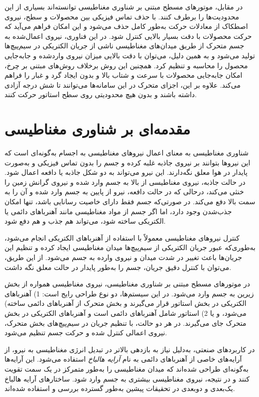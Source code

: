 در مقابل، موتورهای مسطح مبتنی‌ بر شناوری مغناطیسی
 توانسته‌اند بسیاری از این محدودیت‌ها را برطرف کنند. با حذف تماس فیزیکی بین محصولات و سطح، نیروی اصطکاک از معادلات حرکت به‌طور کامل حذف می‌شود و این امکان فراهم می‌آید که حرکت محصولات با دقت بسیار بالایی کنترل شود. در این فناوری، نیروی اعمال‌شده به جسم متحرک از طریق میدان‌های مغناطیسی ناشی از جریان الکتریکی در سیم‌پیچ‌ها تولید می‌شود و به همین دلیل، می‌توان با دقت بالایی میزان نیروی واردشده و جابه‌جایی محصول را محاسبه و تنظیم کرد. همچنین این روش برخلاف روش‌های مبتنی‌ بر چرخ، امکان جابه‌جایی محصولات با سرعت و شتاب بالا و بدون ایجاد گرد و غبار را فراهم می‌کند. علاوه‌ بر این، اجزای متحرک در این سامانه‌ها می‌توانند تا شش درجه آزادی داشته باشند و بدون هیچ محدودیتی روی سطح استاتور حرکت کنند.



\section{مقدمه‌ای بر شناوری مغناطیسی}

شناوری مغناطیسی به معنای اعمال نیروهای مغناطیسی به اجسام به‌گونه‌ای است که این نیروها بتوانند بر نیروی جاذبه غلبه کرده و جسم را بدون تماس فیزیکی و به‌صورت پایدار در هوا معلق نگه‌دارند. این نیرو می‌تواند به دو شکل جاذبه یا دافعه اعمال شود. در حالت جاذبه‌، نیروی مغناطیسی از بالا به جسم وارد شده و نیروی گرانش زمین را خنثی می‌کند، درحالی‌ که در حالت دافعه، نیرو از پایین به جسم وارد شده و آن را به سمت بالا دفع می‌کند. در صورتی‌که جسم فقط دارای خاصیت رسانایی باشد، تنها امکان جذب‌شدن وجود دارد، اما اگر جسم از مواد مغناطیسی مانند آهنرباهای دائمی یا الکتریکی ساخته شود، می‌تواند هم جذب و هم دفع شود.

کنترل نیروهای مغناطیسی معمولاً با استفاده از آهنرباهای الکتریکی انجام می‌شود، به‌طوری‌که عبور جریان الکتریکی از سیم‌پیچ‌ها میدان مغناطیسی ایجاد کرده و تنظیم این جریان‌ها باعث تغییر در شدت میدان و نیروی وارده به جسم می‌شود. از این طریق، می‌توان با کنترل دقیق جریان، جسم را به‌طور پایدار در حالت معلق نگه داشت.

در موتورهای مسطح مبتنی‌ بر شناوری مغناطیسی، نیروی مغناطیسی همواره از بخش زیرین به جسم وارد می‌شود. در این سیستم‌ها، دو نوع طراحی رایج است: 1) آهنرباهای الکتریکی در بخش استاتور قرار می‌گیرند و بخش متحرک از آهنرباهای دائمی ساخته) می‌شود، و یا 2) استاتور شامل آهنرباهای دائمی است و آهنرباهای الکتریکی در بخش متحرک جای می‌گیرند. در هر دو حالت، با تنظیم جریان در سیم‌پیچ‌های بخش متحرک، نیروی اعمالی کنترل شده و حرکت جسم تنظیم می‌شود.

در کاربردهای صنعتی، به‌دلیل نیاز به بازدهی بالاتر در تبدیل انرژی مغناطیسی به نیرو، از آرایه‌های خاصی از آهنرباهای دائمی به نام 
\textit{آرایه هالباخ}
استفاده می‌شود. این آرایه‌ها به‌گونه‌ای طراحی شده‌اند که میدان مغناطیسی را به‌طور متمرکز در یک سمت تقویت کنند و در نتیجه، نیروی مغناطیسی بیشتری به جسم وارد شود. ساختارهای آرایه هالباخ یک‌بعدی و دوبعدی در تحقیقات پیشین به‌طور گسترده بررسی و استفاده شده‌اند.

